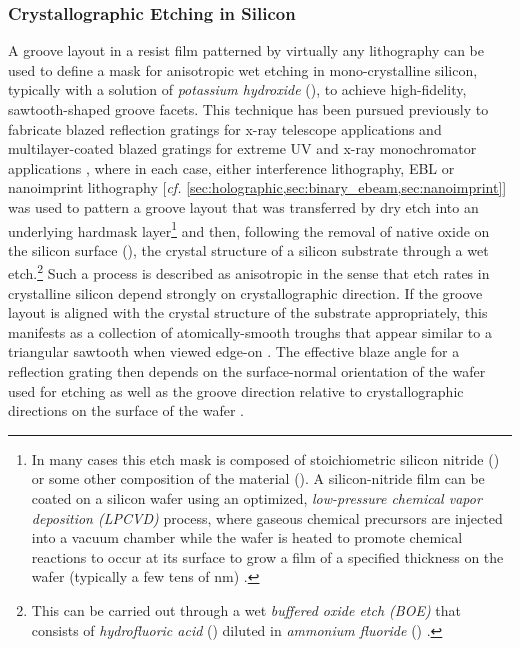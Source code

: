 \subsubsection{Crystallographic Etching in Silicon}\label{sec:crystal_etching}
A groove layout in a resist film patterned by virtually any lithography can be used to define a mask for anisotropic wet etching in mono-crystalline silicon, typically with a solution of \emph{potassium hydroxide} (), to achieve high-fidelity, sawtooth-shaped groove facets. 
This technique has been pursued previously to fabricate blazed reflection gratings for x-ray telescope applications \cite{Franke97,Chang03,Chang04,McEntaffer13,Peterson15,DeRoo16thesis,DeRoo16,Miles18} and multilayer-coated blazed gratings for extreme UV and x-ray monochromator applications \cite{Voronov10,Voronov11,Voronov16}, where in each case, either interference lithography, EBL or nanoimprint lithography [\emph{cf.\@} \cref{sec:holographic,sec:binary_ebeam,sec:nanoimprint}] was used to pattern a groove layout that was transferred by dry etch into an underlying hardmask layer\footnote{In many cases this etch mask is composed of stoichiometric silicon nitride () or some other composition of the material (). A silicon-nitride film can be coated on a silicon wafer using an optimized, \emph{low-pressure chemical vapor deposition (LPCVD)} process, where gaseous chemical precursors are injected into a vacuum chamber while the wafer is heated to promote chemical reactions to occur at its surface to grow a film of a specified thickness on the wafer (typically a few tens of \si{\nm}) \cite{Franssila10}.\label{footnote:nitride_mask}} and then, following the removal of native oxide on the silicon surface (), the crystal structure of a silicon substrate through a wet  etch.\footnote{This can be carried out through a wet \emph{buffered oxide etch (BOE)} that consists of \emph{hydrofluoric acid} () diluted in \emph{ammonium fluoride} () \cite{Franssila10}.\label{footnote:buffered_oxide_etch}}
Such a process is described as anisotropic in the sense that  etch rates in crystalline silicon depend strongly on crystallographic direction. 
If the groove layout is aligned with the crystal structure of the substrate appropriately, this manifests as a collection of atomically-smooth troughs that appear similar to a triangular sawtooth when viewed edge-on \cite{Tsang75,Sato99,Franssila10,Gosalvez15}.
The effective blaze angle for a reflection grating then depends on the surface-normal orientation of the wafer used for etching as well as the groove direction relative to crystallographic directions on the surface of the wafer \cite{McEntaffer13,DeRoo16,Miles18}. 

